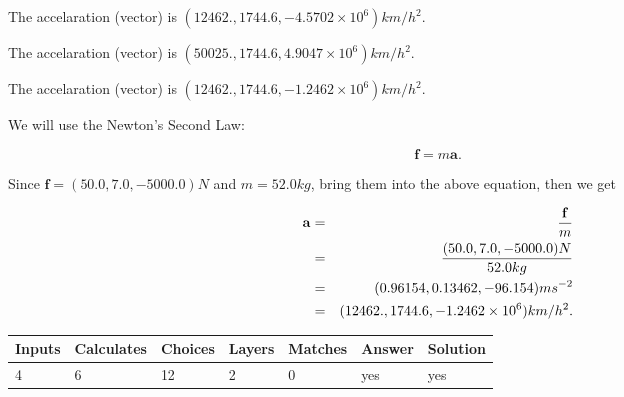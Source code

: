 \documentclass[12pt]{article}
\begin{document}
 
The accelaration (vector) is
$(
12462.,
1744.6 ,
-4.5702 \times 10^{6}
)km/h^2.
$
 
 
The accelaration (vector) is
$(
50025.,
1744.6 ,
4.9047 \times 10^{6}
)km/h^2.
$
 
 
\noindent{}
 
 
The accelaration (vector) is
$(
12462.,
1744.6 ,
-1.2462 \times 10^{6}
)km/h^2.
$
 
 
\noindent{}
 
 
 
 
 
 
\noindent{}
 
 

We will use the Newton's Second Law:
 
\[
\mathbf{f}=m\mathbf{a}.
\]
 
Since $\mathbf{f}=( %
50.0,  %
7.0,  %
-5000.0 )N$
and $m= %
52.0 kg$, bring them into the above equation, then we get
 
\begin{eqnarray*}
\mathbf{a}&=&\frac{\mathbf{f}}m  \\
&=&\frac{(
50.0 ,
7.0 ,
-5000.0 )N
}{ %
52.0 kg}  \\
&=&(
0.96154 ,
0.13462,
-96.154
)ms^{-2} \\
&=&(
12462. ,
1744.6 ,
-1.2462 \times 10^{6}
)km/h^2.
\end{eqnarray*}
 
 
 
\noindent{}
 
 

 
 
\vspace{0.3in}
   
   
   
   
\noindent\begin{tabular}{|l|l|l|l|l|l|l|}
 \hline
Inputs & Calculates & Choices & Layers & Matches & Answer & Solution \\ \hline
           4  & 
           6  & 
          12
  & 
           2  & 
           0  & 
  yes & 
  yes 
  \\ \hline
 \end{tabular}
   
\end{document}
